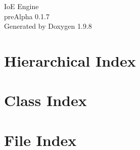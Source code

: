 \documentclass[twoside]{book}
\newcommand{\+}{\discretionary{\mbox{\scriptsize$\hookleftarrow$}}{}{}}
\newcommand{\clearemptydoublepage}{%
    \newpage{\pagestyle{empty}\cleardoublepage}%
  }
\begin{document}
  \raggedbottom
    \hypersetup{pageanchor=false,
                bookmarksnumbered=true,
                pdfencoding=unicode
               }
  \begin{titlepage}
  \vspace*{7cm}
  \begin{center}%
  {\Large Io\+E Engine}\\
  [1ex]\large pre\+Alpha 0.\+1.\+7 \\
  \vspace*{1cm}
  {\large Generated by Doxygen 1.9.8}\\
  \end{center}
  \end{titlepage}
  \clearemptydoublepage
  \tableofcontents
  \clearemptydoublepage
  \hypersetup{pageanchor=true}






\chapter{Hierarchical Index}

\chapter{Class Index}

\chapter{File Index}

\end{document}
